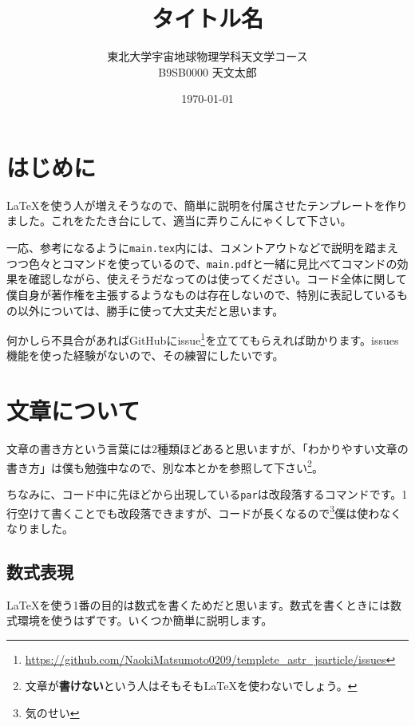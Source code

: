 \documentclass[a4paper,papersize,uplatex,dvipdfmx,10pt]{jsarticle}
\title{タイトル名}
\author{東北大学宇宙地球物理学科天文学コース\\B9SB0000\,\,天文太郎}
\date{\today}
\newcommand{\bs}{\symbol{92}} %
\begin{document}
\maketitle

\nocite{*}

\section{はじめに} %
\LaTeX を使う人が増えそうなので、簡単に説明を付属させたテンプレートを作りました。これをたたき台にして、適当に弄りこんにゃくして下さい。\par
一応、参考になるように\texttt{main.tex}内には、コメントアウトなどで説明を踏まえつつ色々とコマンドを使っているので、\texttt{main.pdf}と一緒に見比べてコマンドの効果を確認しながら、使えそうだなってのは使ってください。コード全体に関して僕自身が著作権を主張するようなものは存在しないので、特別に表記しているもの以外については、勝手に使って大丈夫だと思います。\par
何かしら不具合があればGitHubにissue\footnote{\url{https://github.com/NaokiMatsumoto0209/templete_astr_jsarticle/issues}}を立ててもらえれば助かります。issues機能を使った経験がないので、その練習にしたいです。

\section{文章について} %
文章の書き方という言葉には2種類ほどあると思いますが、「わかりやすい文章の書き方」は僕も勉強中なので、別な本とかを参照して下さい\footnote{文章が\textbf{書けない}という人はそもそも\LaTeX を使わないでしょう。}。\par
ちなみに、コード中に先ほどから出現している\texttt{\bs par}は改段落するコマンドです。1行空けて書くことでも改段落できますが、コードが長くなるので\footnote{気のせい}僕は使わなくなりました。\par

\subsection{数式表現} %
\LaTeX を使う1番の目的は数式を書くためだと思います。数式を書くときには数式環境を使うはずです。いくつか簡単に説明します。
\end{document}
